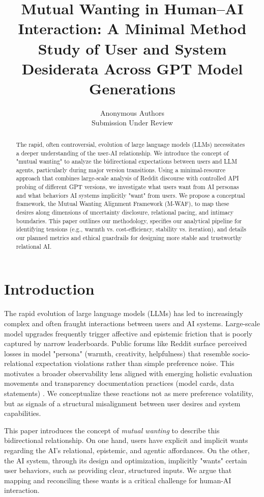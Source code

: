 \documentclass{article}
\title{Mutual Wanting in Human--AI Interaction: A Minimal Method Study of User and System Desiderata Across GPT Model Generations}
\author{Anonymous Authors\\Submission Under Review}
\begin{document}
\maketitle


\begin{abstract}
The rapid, often controversial, evolution of large language models (LLMs) necessitates a deeper understanding of the user-AI relationship. We introduce the concept of "mutual wanting" to analyze the bidirectional expectations between users and LLM agents, particularly during major version transitions. Using a minimal-resource approach that combines large-scale analysis of Reddit discourse with controlled API probing of different GPT versions, we investigate what users want from AI personas and what behaviors AI systems implicitly "want" from users. We propose a conceptual framework, the Mutual Wanting Alignment Framework (M-WAF), to map these desires along dimensions of uncertainty disclosure, relational pacing, and intimacy boundaries. This paper outlines our methodology, specifies our analytical pipeline for identifying tensions (e.g., warmth vs. cost-efficiency, stability vs. iteration), and details our planned metrics and ethical guardrails for designing more stable and trustworthy relational AI.\end{abstract}


\section{Introduction}
The rapid evolution of large language models (LLMs) has led to increasingly complex and often fraught interactions between users and AI systems. Large-scale model upgrades frequently trigger affective and epistemic friction that is poorly captured by narrow leaderboards. Public forums like Reddit surface perceived losses in model "persona" (warmth, creativity, helpfulness) that resemble socio-relational expectation violations rather than simple preference noise. This motivates a broader observability lens aligned with emerging holistic evaluation movements \citep{liang2022helm} and transparency documentation practices (model cards, data statements) \citep{mitchell2019modelcards, bender2018datastatements}. We conceptualize these reactions not as mere preference volatility, but as signals of a structural misalignment between user desires and system capabilities.

This paper introduces the concept of \emph{mutual wanting} to describe this bidirectional relationship. On one hand, users have explicit and implicit wants regarding the AI's relational, epistemic, and agentic affordances. On the other, the AI system, through its design and optimization, implicitly "wants" certain user behaviors, such as providing clear, structured inputs. We argue that mapping and reconciling these wants is a critical challenge for human-AI interaction.
\end{document}
